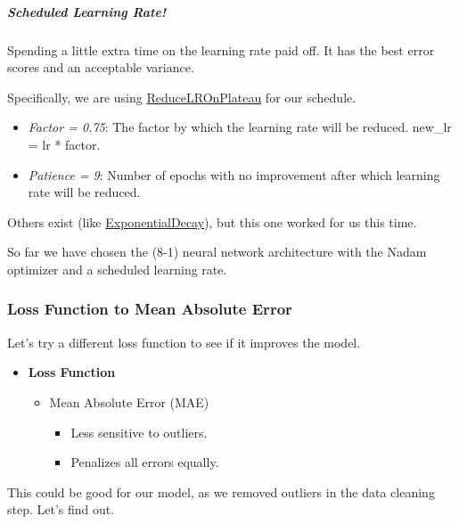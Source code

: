 \documentclass[11pt]{article}
\providecommand{\tightlist}{%
      \setlength{\itemsep}{0pt}\setlength{\parskip}{0pt}}
\begin{document}
\subparagraph{Scheduled Learning Rate!}\label{scheduled-learning-rate}

Spending a little extra time on the learning rate paid off. It has the
best error scores and an acceptable variance.

Specifically, we are using
\href{https://keras.io/api/callbacks/reduce_lr_on_plateau/}{ReduceLROnPlateau}
for our schedule.

\begin{itemize}
\tightlist
\item
  \emph{Factor = 0.75}: The factor by which the learning rate will be
  reduced. new\_lr = lr * factor.
\item
  \emph{Patience = 9}: Number of epochs with no improvement after which
  learning rate will be reduced.
\end{itemize}

Others exist (like
\href{https://keras.io/api/optimizers/schedules/exponential_decay/}{ExponentialDecay}),
but this one worked for us this time.

So far we have chosen the (8-1) neural network architecture with the
Nadam optimizer and a scheduled learning rate.

    \subsubsection{Loss Function to Mean Absolute
Error}\label{loss-function-to-mean-absolute-error}

Let's try a different loss function to see if it improves the model.

\begin{itemize}
\tightlist
\item
  \textbf{Loss Function}

  \begin{itemize}
  \tightlist
  \item
    Mean Absolute Error (MAE)

    \begin{itemize}
    \tightlist
    \item
      Less sensitive to outliers.
    \item
      Penalizes all errors equally.
    \end{itemize}
  \end{itemize}
\end{itemize}

This could be good for our model, as we removed outliers in the data
cleaning step. Let's find out.
\end{document}
